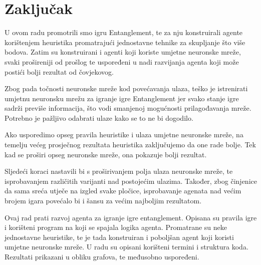 \documentclass[zavrsnirad]{fer}
\begin{document}
\chapter{Zaključak}
\label{pog:zakljucak}

U ovom radu promotrili smo igru Entanglement, te za nju konstruirali agente korištenjem heuristika promatrajući jednostavne tehnike za skupljanje što više bodova. Zatim su konstruirani i agenti koji koriste umjetne neuronske mreže, svaki prošireniji od prošlog te uspoređeni u nadi razvijanja agenta koji može postići bolji rezultat od čovjekovog.

Zbog pada točnosti neuronske mreže kod povećavanja ulaza, teško je istrenirati umjetnu neuronsku mrežu za igranje igre Entanglement jer svako stanje igre sadrži previše informacija, što vodi smanjenoj mogućnosti prilagođavanja mreže. Potrebno je pažljivo odabrati ulaze kako se to ne bi dogodilo.

Ako usporedimo opseg pravila heuristike i ulaza umjetne neuronske mreže, na temelju većeg prosječnog rezultata heuristika zaključujemo da one rade bolje. Tek kad se proširi opseg neuronske mreže, ona pokazuje bolji rezultat.

Sljedeći koraci nastavili bi s proširivanjem polja ulaza neuronske mreže, te isprobavanjem različitih varijanti nad postojećim ulazima. Također, zbog činjenice da sama sreća utječe na izgled svake pločice, isprobavanje agenata nad većim brojem igara povećalo bi i šansu za većim najboljim rezultatom.  









\begin{sazetak}
   Ovaj rad prati razvoj agenta za igranje igre entanglement. Opisana su pravila igre i korišteni program na koji se spajala logika agenta. Promatrane su neke jednostavne heuristike, te je tada konstruiran i poboljšan agent koji koristi umjetne neuronske mreže. U radu su opisani korišteni termini i struktura koda. Rezultati prikazani u obliku grafova, te međusobno uspoređeni. 

\end{sazetak}
\end{document}
